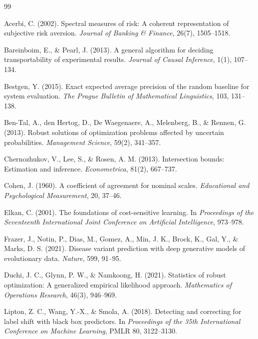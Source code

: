 \documentclass[11pt]{article}
\theoremstyle{remark}
\begin{document}
\begin{thebibliography}{99}
\setlength{\itemsep}{0.25em}

Acerbi, C. (2002).
Spectral measures of risk: A coherent representation of subjective risk aversion.
\emph{Journal of Banking \& Finance}, 26(7), 1505--1518.

Bareinboim, E., \& Pearl, J. (2013).
A general algorithm for deciding transportability of experimental results.
\emph{Journal of Causal Inference}, 1(1), 107--134.

Bestgen, Y. (2015).
Exact expected average precision of the random baseline for system evaluation.
\emph{The Prague Bulletin of Mathematical Linguistics}, 103, 131--138.

Ben-Tal, A., den Hertog, D., De Waegenaere, A., Melenberg, B., \& Rennen, G. (2013).
Robust solutions of optimization problems affected by uncertain probabilities.
\emph{Management Science}, 59(2), 341--357.

Chernozhukov, V., Lee, S., \& Rosen, A. M. (2013).
Intersection bounds: Estimation and inference.
\emph{Econometrica}, 81(2), 667--737.

Cohen, J. (1960).
A coefficient of agreement for nominal scales.
\emph{Educational and Psychological Measurement}, 20, 37--46.

Elkan, C. (2001).
The foundations of cost-sensitive learning.
In \emph{Proceedings of the Seventeenth International Joint Conference on Artificial Intelligence}, 973--978.

Frazer, J., Notin, P., Dias, M., Gomez, A., Min, J. K., Brock, K., Gal, Y., \& Marks, D. S. (2021).
Disease variant prediction with deep generative models of evolutionary data.
\emph{Nature}, 599, 91--95.

Duchi, J. C., Glynn, P. W., \& Namkoong, H. (2021).
Statistics of robust optimization: A generalized empirical likelihood approach.
\emph{Mathematics of Operations Research}, 46(3), 946--969.

Lipton, Z. C., Wang, Y.-X., \& Smola, A. (2018).
Detecting and correcting for label shift with black box predictors.
In \emph{Proceedings of the 35th International Conference on Machine Learning}, PMLR 80, 3122--3130.


\end{thebibliography}
\end{document}
